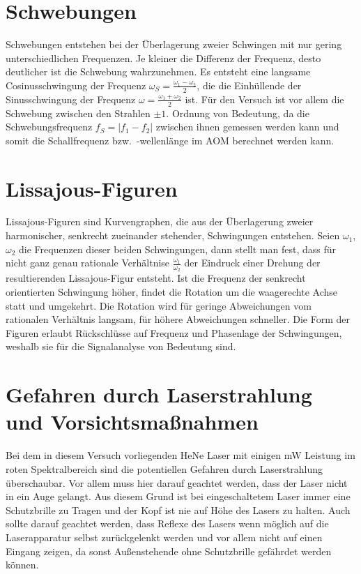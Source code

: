 \documentclass[bigchapter,colorback,accentcolor=tud4b,linedtoc,11pt]{tudreport}
\begin{document}
\section{Schwebungen}

Schwebungen entstehen bei der Überlagerung zweier Schwingen mit nur gering unterschiedlichen Frequenzen. Je kleiner die Differenz der Frequenz, desto deutlicher ist die Schwebung wahrzunehmen. Es entsteht eine langsame Cosinusschwingung der Frequenz $\omega_S = \frac{\omega_1 - \omega_2}{2}$, die die Einhüllende der Sinusschwingung der Frequenz $\omega = \frac{\omega_1 + \omega_2}{2}$ ist. Für den Versuch ist vor allem die Schwebung zwischen den Strahlen $\pm 1$. Ordnung von Bedeutung, da die Schwebungsfrequenz $f_S = |f_1 - f_2|$ zwischen ihnen gemessen werden kann und somit die Schallfrequenz bzw.\ -wellenlänge im AOM berechnet werden kann.

\section{Lissajous-Figuren}

Lissajous-Figuren sind Kurvengraphen, die aus der Überlagerung zweier harmonischer, senkrecht zueinander stehender, Schwingungen entstehen. Seien $\omega_1$, $\omega_2$ die Frequenzen dieser beiden Schwingungen, dann stellt man fest, dass für nicht ganz genau rationale Verhältnise $\frac{\omega_1}{\omega_2}$ der Eindruck einer Drehung der resultierenden Lissajous-Figur entsteht. Ist die Frequenz der senkrecht orientierten Schwingung höher, findet die Rotation um die waagerechte Achse statt und umgekehrt. Die Rotation wird für geringe Abweichungen vom rationalen Verhältnis langsam, für höhere Abweichungen schneller. Die Form der Figuren erlaubt Rückschlüsse auf Frequenz und Phasenlage der Schwingungen, weshalb sie für die Signalanalyse von Bedeutung sind.

\section{Gefahren durch Laserstrahlung und Vorsichtsmaßnahmen} %

Bei dem in diesem Versuch vorliegenden HeNe Laser mit einigen mW Leistung im roten Spektralbereich sind die potentiellen Gefahren durch Laserstrahlung überschaubar. Vor allem muss hier darauf geachtet werden, dass der Laser nicht in ein Auge gelangt. Aus diesem Grund ist bei eingeschaltetem Laser immer eine Schutzbrille zu Tragen und der Kopf ist nie auf Höhe des Lasers zu halten. Auch sollte darauf geachtet werden, dass Reflexe des Lasers wenn möglich auf die Laserapparatur selbst zurückgelenkt werden und vor allem nicht auf einen Eingang zeigen, da sonst Außenstehende ohne Schutzbrille gefährdet werden können.
\end{document}
